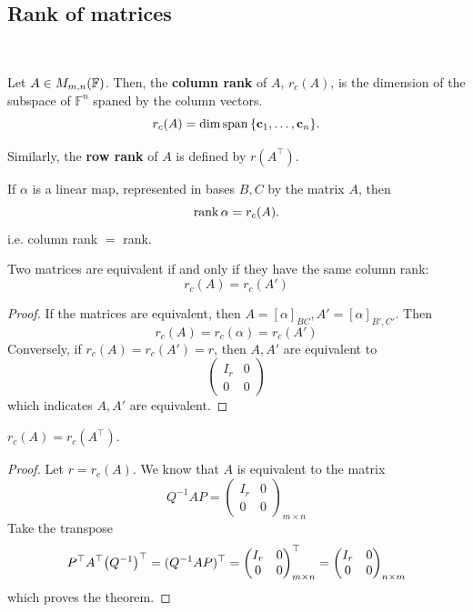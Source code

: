 \documentclass[a4paper]{article}
\begin{document}
\subsection{Rank of matrices}\ \vspace*{-1.5em}
\begin{definition}
	Let \( A \in M_{m,n}({\mathbb{F}}) \).
	Then, the \textbf{column rank} of \( A \), \( r_c(A) \), is the dimension of the subspace of \( \mathbb{F}^n \) spaned by the column vectors.
	\[
		r_c(A) = \dim \operatorname{span} \qty{{\bf c}_1, \dots, {\bf c}_n}.
	\]

    Similarly, the \textbf{row rank} of $A$ is defined by $ r(A^\top) $.
\end{definition}

\begin{remark}
	If \( \alpha \) is a linear map, represented in bases \( B, C \) by the matrix \( A \), then
	\[
		\rank \alpha = r_c(A). 
	\]
    i.e. column rank $=$ rank.
\end{remark}

\begin{proposition}
	Two matrices are equivalent if and only if they have the same column rank:
	\[
		r_c(A) = r_c(A')
	\]
\end{proposition}
\begin{proof}
	If the matrices are equivalent, then \( A = [\alpha]_{BC}, A' = [\alpha]_{B',C'} \).
	Then
	\[
		r_c(A) = r_c(\alpha) = r_c(A')
	\]
	Conversely, if \( r_c(A) = r_c(A') = r \), then \( A, A' \) are equivalent to
	\[
		\begin{pmatrix}
			I_r & 0 \\
			0   & 0
		\end{pmatrix}
	\]
	which indicates \( A, A' \) are equivalent.
\end{proof}

\begin{theorem}
    $ r_c(A) = r_c(A^\top) $. 
\end{theorem}
\begin{proof}
    Let $ r = r_c(A) $. We know that $A$ is equivalent to the matrix 
    \[
        Q^{-1}AP = \begin{pmatrix}
			I_r & 0 \\
			0   & 0
		\end{pmatrix}_{m\times n}
    \]
    Take the transpose
    \[
		P^\top A^\top \qty(Q^{-1})^\top = (Q^{-1}AP)^\top = \begin{pmatrix}
			I_r & 0 \\
			0   & 0
		\end{pmatrix}_{m \times n}^\top = \begin{pmatrix}
			I_r & 0 \\
			0   & 0
		\end{pmatrix}_{n \times m}
	\]
    which proves the theorem. 
\end{proof}
\end{document}
